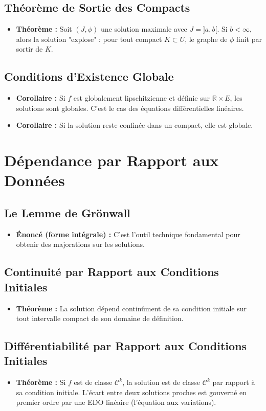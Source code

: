 \documentclass[12pt, a4paper, parskip=full]{report}
\theoremstyle{agregstyle}
\begin{document}
\subsection{Théorème de Sortie des Compacts}
\begin{itemize}
    \item \textbf{Théorème :} Soit $(J, \phi)$ une solution maximale avec $J=]a,b[$. Si $b < \infty$, alors la solution "explose" : pour tout compact $K \subset U$, le graphe de $\phi$ finit par sortir de $K$.
\end{itemize}
\subsection{Conditions d'Existence Globale}
\begin{itemize}
    \item \textbf{Corollaire :} Si $f$ est globalement lipschitzienne et définie sur $\mathbb{R} \times E$, les solutions sont globales. C'est le cas des équations différentielles linéaires.
    \item \textbf{Corollaire :} Si la solution reste confinée dans un compact, elle est globale.
\end{itemize}

\section{Dépendance par Rapport aux Données}
\subsection{Le Lemme de Grönwall}
\begin{itemize}
    \item \textbf{Énoncé (forme intégrale) :} C'est l'outil technique fondamental pour obtenir des majorations sur les solutions.
\end{itemize}
\subsection{Continuité par Rapport aux Conditions Initiales}
\begin{itemize}
    \item \textbf{Théorème :} La solution dépend continûment de sa condition initiale sur tout intervalle compact de son domaine de définition.
\end{itemize}
\subsection{Différentiabilité par Rapport aux Conditions Initiales}
\begin{itemize}
    \item \textbf{Théorème :} Si $f$ est de classe $\mathcal{C}^k$, la solution est de classe $\mathcal{C}^k$ par rapport à sa condition initiale. L'écart entre deux solutions proches est gouverné en premier ordre par une EDO linéaire (l'équation aux variations).
\end{itemize}
\end{document}
